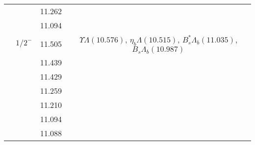 \documentclass[prd,twocolumn,floatfix,nofootinbib]{revtex4}
\begin{document}
\begin{table*}[!htbp]
\begin{tabular}{cccc}
            &               &11.262 & \\
            &               &11.094 & \\
            &${1/2}^{-}$    &11.505 &$\Upsilon\Lambda(10.576)$, $\eta_{b}\Lambda(10.515)$, $B_{s}^{\ast}\Lambda_{b}(11.035)$, $B_{s}\Lambda_{b}(10.987)$ \\
            &               &11.439 & \\
            &               &11.429 & \\
            &               &11.259 & \\
            &               &11.210 & \\
            &               &11.094 & \\
            &               &11.088 & \\
        \hline\hline
    \end{tabular}
\end{table*}
\end{document}
